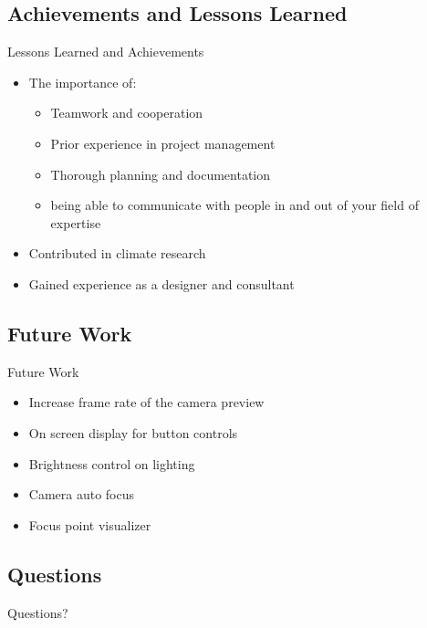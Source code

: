 \documentclass[17pt, aspectratio=169]{beamer}
\begin{document}
\subsection{Achievements and Lessons Learned}
\begin{frame}{Lessons Learned and Achievements}
	\begin{itemize}
		\item The importance of:
		      \begin{itemize}
			      \item Teamwork and cooperation
			      \item Prior experience in project management
			      \item Thorough planning and documentation
			      \item being able to communicate with people in and out of your field of expertise
		      \end{itemize}
		\item Contributed in climate research
		\item Gained experience as a designer and consultant
	\end{itemize}
\end{frame}
\subsection{Future Work}
\begin{frame}{Future Work}
	\begin{itemize}
		\item Increase frame rate of the camera preview
		\item On screen display for button controls
		\item Brightness control on lighting
		\item Camera auto focus
		\item Focus point visualizer
	\end{itemize}
\end{frame}
\subsection{Questions}
\begin{frame}
	Questions?
\end{frame}
\end{document}
